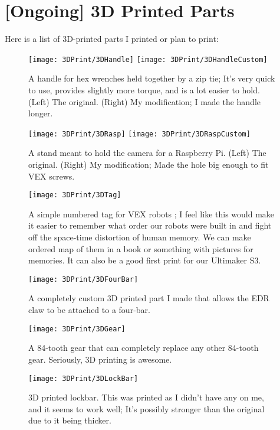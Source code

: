 \section{[Ongoing] 3D Printed Parts}
Here is a list of 3D-printed parts I printed or plan to print:

\begin{figure}[h]
    \centering
    \texttt{[image: 3DPrint/3DHandle]}
    \texttt{[image: 3DPrint/3DHandleCustom]}
    \caption{
        A handle for hex wrenches held together by a zip tie; It's very quick to use, provides slightly more torque, and is a lot easier to hold. (Left) The original. \cite{3DHandle} (Right) My modification; I made the handle longer.
    }
\end{figure}


\begin{figure}[h]
    \centering
    \texttt{[image: 3DPrint/3DRasp]}
    \texttt{[image: 3DPrint/3DRaspCustom]}
    \caption{
        A stand meant to hold the camera for a Raspberry Pi. (Left) The original. \cite{3DRasp} (Right) My modification; Made the hole big enough to fit VEX screws.
    }
\end{figure}

\begin{figure}[h]
    \centering
    \texttt{[image: 3DPrint/3DTag]}
    \caption{
        A simple numbered tag for VEX robots \cite{3DTag}; I feel like this would make it easier to remember what order our robots were built in and fight off the space-time distortion of human memory. We can make ordered map of them in a book or something with pictures for memories. It can also be a good first print for our Ultimaker S3.
    }
\end{figure}


\begin{figure}[h]
    \centering
    \texttt{[image: 3DPrint/3DFourBar]}
    \caption{
        A completely custom 3D printed part I made that allows the EDR claw to be attached to a four-bar.
    }
\end{figure}

\begin{figure}[h]
    \centering
    \texttt{[image: 3DPrint/3DGear]}
    \caption{
        A 84-tooth gear that can completely replace any other 84-tooth gear. Seriously, 3D printing is awesome.
    }
\end{figure}

\begin{figure}[h]
    \centering
    \texttt{[image: 3DPrint/3DLockBar]}
    \caption{
        3D printed lockbar. This was printed as I didn't have any on me, and it seems to work well; It's possibly stronger than the original due to it being thicker.
    }
\end{figure}
